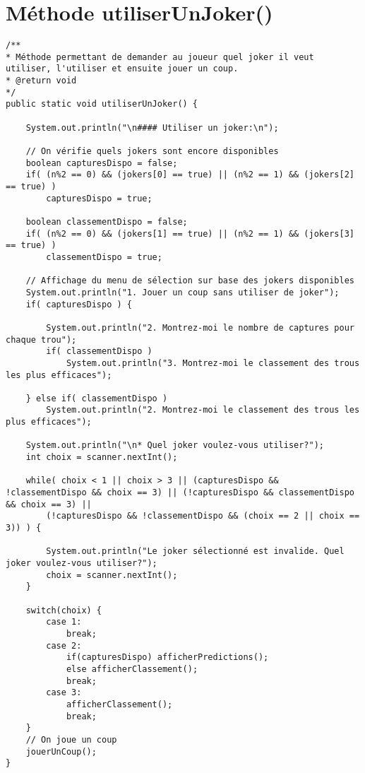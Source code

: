 \documentclass[11pt,a4paper]{report}
\begin{document}
    \section{Méthode utiliserUnJoker()}
        \begin{lstlisting}
/**
* Méthode permettant de demander au joueur quel joker il veut utiliser, l'utiliser et ensuite jouer un coup.
* @return void
*/
public static void utiliserUnJoker() {

    System.out.println("\n#### Utiliser un joker:\n");

    // On vérifie quels jokers sont encore disponibles
    boolean capturesDispo = false;
    if( (n%2 == 0) && (jokers[0] == true) || (n%2 == 1) && (jokers[2] == true) )
        capturesDispo = true;

    boolean classementDispo = false;
    if( (n%2 == 0) && (jokers[1] == true) || (n%2 == 1) && (jokers[3] == true) )
        classementDispo = true;

    // Affichage du menu de sélection sur base des jokers disponibles
    System.out.println("1. Jouer un coup sans utiliser de joker");
    if( capturesDispo ) {
    
        System.out.println("2. Montrez-moi le nombre de captures pour chaque trou");
        if( classementDispo )
            System.out.println("3. Montrez-moi le classement des trous les plus efficaces");
    
    } else if( classementDispo )
        System.out.println("2. Montrez-moi le classement des trous les plus efficaces");

    System.out.println("\n* Quel joker voulez-vous utiliser?");
    int choix = scanner.nextInt();

    while( choix < 1 || choix > 3 || (capturesDispo && !classementDispo && choix == 3) || (!capturesDispo && classementDispo && choix == 3) || 
        (!capturesDispo && !classementDispo && (choix == 2 || choix == 3)) ) {

        System.out.println("Le joker sélectionné est invalide. Quel joker voulez-vous utiliser?");
        choix = scanner.nextInt();
    }

    switch(choix) {
        case 1:
            break;
        case 2:
            if(capturesDispo) afficherPredictions();
            else afficherClassement();
            break;
        case 3:
            afficherClassement();
            break;
    }
    // On joue un coup
    jouerUnCoup();
}
        \end{lstlisting}
\end{document}
